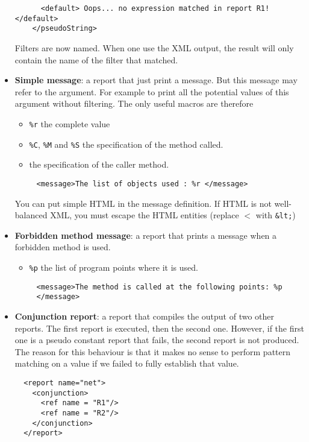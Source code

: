 \begin{itemize}
\begin{verbatim}
      <default> Oops... no expression matched in report R1! </default>
    </pseudoString>
\end{verbatim}
Filters are now named. When one use the XML output, the result will only
contain the name of the filter that matched.
\item{\textbf{Simple message}}: a report that just print a message. But this
message may refer to the argument. For example to print all the potential values
of this argument without filtering. The only useful macros are therefore 
  \begin{itemize}
    \item \texttt{\%r} the complete value
    \item \texttt{\%C}, \texttt{\%M} and \texttt{\%S} the specification of the
    method called.
    \item the specification of the caller method.
  \end{itemize}
\begin{verbatim}
     <message>The list of objects used : %r </message>
\end{verbatim}
  You can put simple HTML in the message definition. If HTML is not
  well-balanced XML, you must escape the HTML entities (replace $<$ with
  \verb!&lt;!)
\item{\textbf{Forbidden method message}}: a report that prints a message when a
forbidden method is used. 
  \begin{itemize}
    \item \texttt{\%p} the list of program points where it is used.
  \end{itemize}
\begin{verbatim}
     <message>The method is called at the following points: %p
     </message>
\end{verbatim}
  
\item{\textbf{Conjunction report}}: a report that compiles the output
  of two other reports. The first report is executed, then the second
  one. However, if the first one is a pseudo constant
  report that fails, the second report is not produced. The reason for
  this behaviour is that it makes no sense to perform pattern matching
  on a value if we failed to fully establish that value.

\begin{verbatim}
  <report name="net">
    <conjunction>
      <ref name = "R1"/>
      <ref name = "R2"/>
    </conjunction>
  </report>
\end{verbatim}
    

\end{itemize}
